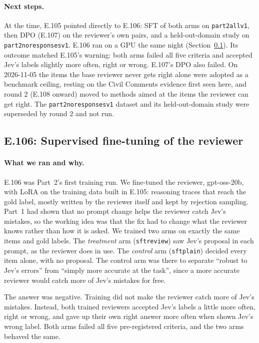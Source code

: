 \documentclass[11pt]{article}
\renewcommand{\_}{\origunderscore\allowbreak}
\begin{document}
\paragraph{Next steps.}
At the time, E.105 pointed directly to E.106: SFT of both arms on \texttt{part2\_all\_v1}, then DPO (E.107) on the reviewer's own pairs, and a held-out-domain study on \texttt{part2\_no\_responses\_v1}. E.106 ran on a GPU the same night (Section~\ref{sec:e106}). Its outcome matched E.105's warning: both arms failed all five criteria and accepted Jev's labels slightly more often, right or wrong. E.107's DPO also failed. On 2026-11-05 the items the base reviewer never gets right alone were adopted as a benchmark ceiling, resting on the Civil Comments evidence first seen here, and round 2 (E.108 onward) moved to methods aimed at the items the reviewer can get right. The \texttt{part2\_no\_responses\_v1} dataset and its held-out-domain study were superseded by round 2 and not run.

\subsection{E.106: Supervised fine-tuning of the reviewer}\label{sec:e106}

\paragraph{What we ran and why.}
E.106 was Part~2's first training run. We fine-tuned the reviewer, gpt-oss-20b, with LoRA on the training data built in E.105: reasoning traces that reach the gold label, mostly written by the reviewer itself and kept by rejection sampling. Part~1 had shown that no prompt change helps the reviewer catch Jev's mistakes, so the working idea was that the fix had to change what the reviewer knows rather than how it is asked. We trained two arms on exactly the same items and gold labels. The \emph{treatment} arm (\texttt{sft\_review}) saw Jev's proposal in each prompt, as the reviewer does in use. The \emph{control} arm (\texttt{sft\_plain}) decided every item alone, with no proposal. The control arm was there to separate ``robust to Jev's errors'' from ``simply more accurate at the task'', since a more accurate reviewer would catch more of Jev's mistakes for free.

The answer was negative. Training did not make the reviewer catch more of Jev's mistakes. Instead, both trained reviewers accepted Jev's labels a little more often, right or wrong, and gave up their own right answer more often when shown Jev's wrong label. Both arms failed all five pre-registered criteria, and the two arms behaved the same.
\end{document}
